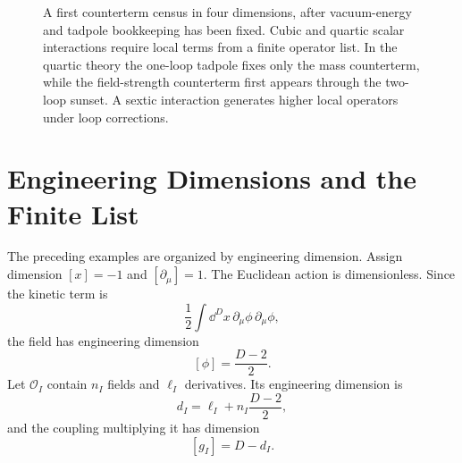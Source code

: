 \begin{figure}[H]
{
  }
  \caption{A first counterterm census in four dimensions, after vacuum-energy
  and tadpole bookkeeping has been fixed.  Cubic and quartic scalar
  interactions require local terms from a finite operator list.  In the
  quartic theory the one-loop tadpole fixes only the mass counterterm, while
  the field-strength counterterm first appears through the two-loop sunset.
  A sextic interaction generates higher local operators under loop
  corrections.}
  \label{fig:volume-ii-counterterm-census}
\end{figure}

\section{Engineering Dimensions and the Finite List}

The preceding examples are organized by engineering dimension.  Assign
dimension \([x]=-1\) and \([\partial_\mu]=1\).  The Euclidean action is
dimensionless.  Since the kinetic term is
\[
  \frac12\int \dd^Dx\,\partial_{\mu}\phi\,\partial_{\mu}\phi ,
\]
the field has engineering dimension
\[
  [\phi]=\frac{D-2}{2}.
\]
Let \(\mathcal O_I\) contain \(n_I\) fields and \(\ell_I\) derivatives.  Its
engineering dimension is
\[
  d_I=\ell_I+n_I\frac{D-2}{2},
\]
and the coupling multiplying it has dimension
\[
  [g_I]=D-d_I .
\]

